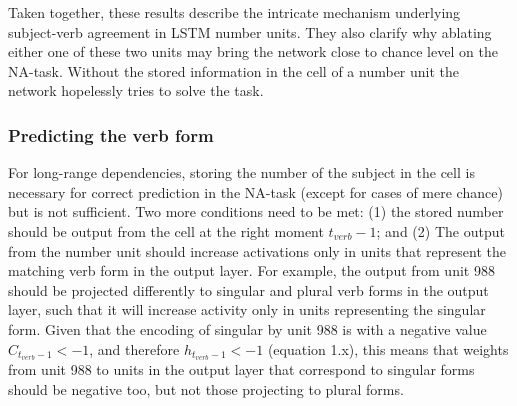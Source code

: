 Taken together, these results describe the intricate mechanism underlying subject-verb agreement in LSTM number units. 
They also clarify why ablating either one of these two units may bring the network close to chance level on the NA-task. 
Without the stored information in the cell of a number unit the network hopelessly tries to solve the task.



\subsubsection{Predicting the verb form}
For long-range dependencies, storing the number of the subject in the cell is necessary for correct prediction in the NA-task (except for cases of mere chance) but is not sufficient. 
Two more conditions need to be met: (1) the stored number should be output from the cell at the right moment $t_{verb}-1$; and (2) The output from the number unit should increase activations only in units that represent the matching verb form in the output layer. 
For example, the output from unit 988 should be projected differently to singular and plural verb forms in the output layer, such that it will increase activity only in units representing the singular form. 
Given that the encoding of singular by unit 988 is with a negative value $C_{t_{verb}-1}<-1$, and therefore $h_{t_{verb}-1}<-1$ (equation 1.x), this means that weights from unit 988 to units in the output layer that correspond to singular forms should be negative too, but not those projecting to plural forms.


